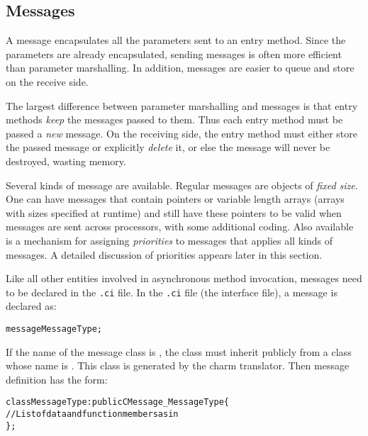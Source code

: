 \subsection{Messages}

\label{messages}
A message encapsulates all the parameters sent to an
entry method.  Since the parameters are already encapsulated,
sending messages is often more efficient than parameter marshalling.
In addition, messages are easier to queue and store on the
receive side.

The largest difference between parameter marshalling and messages
is that entry methods {\em keep} the messages passed to them.
Thus each entry method must be passed a {\em new} message.
On the receiving side, the entry method must either store the
passed message or explicitly {\em delete} it, or else the message
will never be destroyed, wasting memory.

Several kinds of message are available.
Regular \charmpp{} messages are objects of
\textit{fixed size}. One can have messages that contain pointers or variable
length arrays (arrays with sizes specified at runtime) and still have these
pointers to be valid when messages are sent across processors, with some
additional coding.  Also available is a mechanism for assigning
\textit{priorities} to messages that applies all kinds of messages.
A detailed discussion of priorities appears later in this section.

Like all other entities involved in asynchronous method invocation, messages
need to be declared in the {\tt .ci} file. In the {\tt .ci} file (the
interface file), a message is declared as: 

\begin{alltt}
 message MessageType;
\end{alltt}

%
%
If the name of the message class is , the class must inherit 
publicly from a class whose name is . This class
is generated by the charm translator. Then message definition has the form:

\begin{alltt}
 class MessageType : public CMessage_MessageType \{
    // List of data and function members as in \CC
 \};
\end{alltt}


